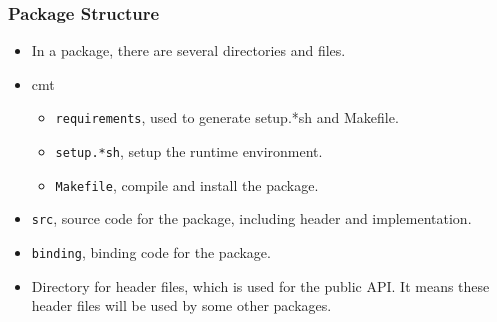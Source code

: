\begin{frame}
    \frametitle{Package Structure}
    \begin{itemize}
        \item In a package, there are several directories and files.
        \item cmt
            \begin{itemize}
                \item {\tt requirements}, used to generate setup.*sh and Makefile.
                \item {\tt setup.*sh}, setup the runtime environment.
                \item {\tt Makefile}, compile and install the package.
            \end{itemize}
        \item {\tt src}, source code for the package, including header 
                and implementation.
        \item {\tt binding}, binding code for the package.
        \item Directory for header files, which is used for the public API.
                It means these header files will be used by 
                some other packages.
    \end{itemize}
\end{frame}
